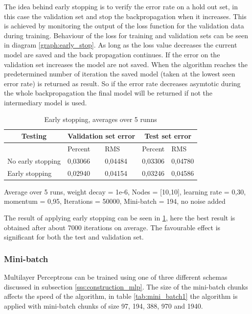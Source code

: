 The idea behind early stopping is to verify the error rate on a hold out set, in this case the validation set and stop the backpropagation when it increases. This is achieved by monitoring the output of the loss function for the validation data during training. Behaviour of the loss for training and validation sets can be seen in diagram \ref{graph:early_stop}. As long as the loss value decreases the current model are saved and the back propagation continues. If the error on the validation set increases the model are not saved. When the algorithm reaches the predetermined number of iteration the saved model (taken at the lowest seen error rate) is returned as result. So if the error rate decreases asymtotic during the whole backpropagation the final model will be returned if not the intermediary model is used.  
\\

\begin{table}[H]
\begin{threeparttable}
\begin{tabular}{ | l | l | l | l | l | } 
\hline
\multicolumn{1}{|c|}{Testing} & \multicolumn{2}{|c|}{Validation set error}  & \multicolumn{2}{|c|}{Test set error} \\
\hline 
 & Percent & RMS  & Percent & RMS \\
\hline
No early stopping  & 0,03066 & 0,04484 & 0,03306 & 0,04780 \\
\hline
Early stopping & 0,02940 & 0,04154 & 0,03246 & 0,04586 \\
\hline
\end{tabular} 
\begin{tablenotes}
      \small
      \item Average over 5 runs, weight decay = 1e-6, Nodes = [10,10], learning rate = 0,30, momentum = 0,95, Iterations = 50000, Mini-batch = 194, no noise added 
\end{tablenotes}
\caption{Early stopping, averages over 5 runns}
\label{tab:early_stop1}
\end{threeparttable}
\end{table}
The result of applying early stopping can be seen in \ref{tab:early_stop1}, here the best result is obtained after about 7000 iterations on average. The favourable effect is significant for both the test and validation set.

\subsubsection{Mini-batch} \label{sss:boosting_mlp_minibatch}
Multilayer Perceptrons can be trained using one of three different schemas discussed in subsection \ref{sss:construction_mlp}. The size of the mini-batch chunks affects the speed of the algorithm, in table \ref{tab:mini_batch1} the algorithm is applied with mini-batch chunks of size 97, 194, 388, 970 and 1940. 


